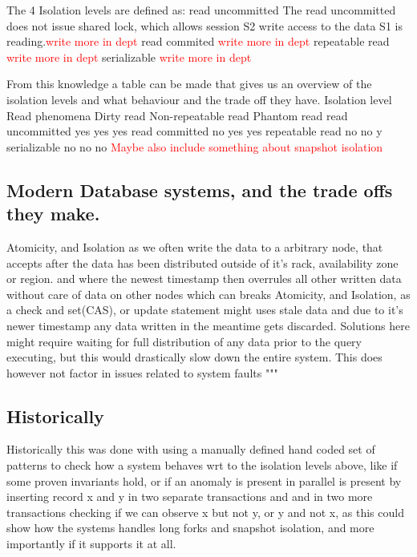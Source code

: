 \documentclass[a4paper,10pt,titlepage]{report}
\begin{document}
The 4 Isolation levels are defined as:
read uncommitted
       The read uncommitted does not issue shared lock, which allows session S2 write access to the data S1 is reading.\textcolor{red}{write more in dept} 
 read commited
 \textcolor{red}{write more in dept} 
repeatable read
\textcolor{red}{write more in dept} 
serializable
\textcolor{red}{write more in dept} 



From this knowledge a table can be made that gives us an overview of the isolation levels and what behaviour and the trade off they have.
Isolation level	Read phenomena
Dirty read	Non-repeatable read	Phantom read
read uncommitted	yes	yes	yes
read committed	no	yes	yes
repeatable read	no	no	y
serializable	no	no	no
\textcolor{red}{Maybe also include something about snapshot isolation} 


\subsection{Modern Database systems, and the trade offs they make.}


Atomicity, and Isolation as we often write the data to a arbitrary node, that accepts after the data has been distributed outside of it's rack, availability zone or region. and where the newest timestamp then overrules all other written data without care of data on other nodes which can breaks Atomicity, and Isolation, as a check and set(CAS), or update statement might uses stale data and due to it's newer timestamp any data written in the meantime gets discarded. Solutions here might require waiting for full distribution of any data prior to the query executing, but this would drastically slow down the entire system. This does however not factor in issues related to system faults
"""

\subsection{Historically}

Historically this was done with using a manually defined hand coded set of patterns to check how a system behaves wrt to the isolation levels above, like if some proven invariants hold, or if an anomaly is present in parallel is present by inserting record x and y in two separate transactions and and in two more transactions checking if we can observe x but not y, or y and not x, as this could show how the systems handles long forks and snapshot isolation, and more importantly if it supports it at all.
\end{document}
